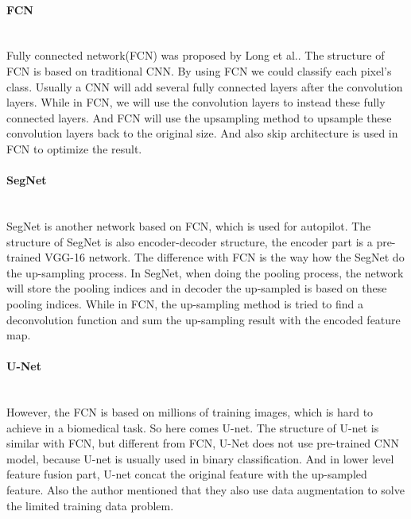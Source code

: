 \documentclass{kththesis}
\begin{document}
\paragraph{FCN}~{}\\
\noindent Fully connected network(FCN) was proposed by Long et al.\cite{long2015fully}. The structure of FCN is based on traditional CNN. By using FCN we could classify each pixel's class. Usually a CNN will add several fully connected layers after the convolution layers. While in FCN, we will use the convolution layers to instead these fully connected layers. And FCN will use the upsampling method to upsample these convolution layers back to the original size. And also skip architecture is used in FCN to optimize the result.

\paragraph{SegNet}~{}\\
\noindent SegNet\cite{badrinarayanan2017segnet} is another network based on FCN, which is used for autopilot. The structure of SegNet is also encoder-decoder structure, the encoder part is a pre-trained VGG-16\cite{simonyan2014very} network. The difference with FCN is the way how the SegNet do the up-sampling process. In SegNet, when doing the pooling process, the network will store the pooling indices and in decoder the up-sampled is based on these pooling indices. While in FCN, the up-sampling method is tried to find a deconvolution function and sum the up-sampling result with the encoded feature map. 

\paragraph{U-Net}~{}\\
\noindent However, the FCN is based on millions of training images, which is hard to achieve in a biomedical task. So here comes U-net\cite{ronneberger2015u}. The structure of U-net is similar with FCN, but different from FCN, U-Net does not use pre-trained CNN model\cite{simonyan2014very}, because U-net is usually used in binary classification. And in lower level feature fusion part, U-net concat the original feature with the up-sampled feature. Also the author mentioned that they also use data augmentation to solve the limited training data problem.  
\end{document}
